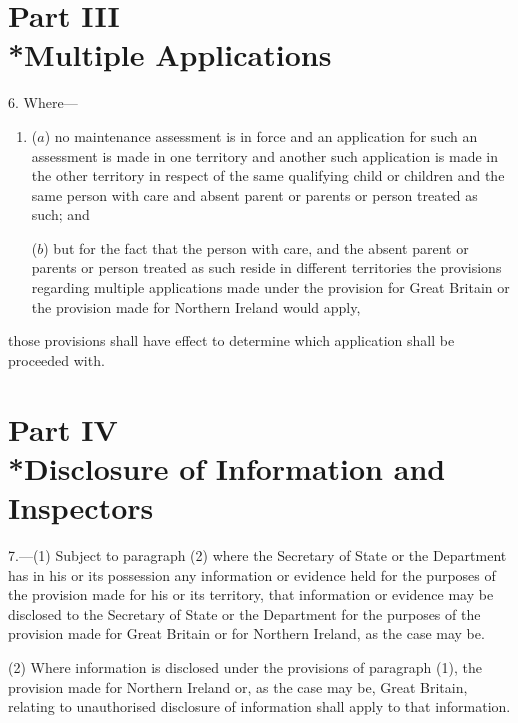 \documentclass[12pt,a4paper]{article}
\begin{document}
\section[Part III --- Multiple Applications]{Part III\\*Multiple Applications}

\renewcommand\parthead{--- Schedule 1 Part III}

6.  Where—
\begin{enumerate}\item[]
($a$) no maintenance assessment is in force and an application for such an assessment is made in one territory and another such application is made in the other territory in respect of the same qualifying child or children and the same person with care and absent parent or parents or person treated as such; and

($b$) but for the fact that the person with care, and the absent parent or parents or person treated as such reside in different territories the provisions regarding multiple applications made under the provision for Great Britain or the provision made for Northern Ireland would apply,
\end{enumerate}
those provisions shall have effect to determine which application shall be proceeded with.

\section[Part IV --- Disclosure of Information and Inspectors]{Part IV\\*Disclosure of Information and Inspectors}

\renewcommand\parthead{--- Schedule 1 Part IV}

7.—(1) Subject to paragraph (2) where the Secretary of State
or the Department  %
has in his or its possession any information or evidence held for the purposes of the provision made for his or its territory, that information or evidence may be disclosed to the Secretary of State
or the Department  %
for the purposes of the provision made for Great Britain or for Northern Ireland, as the case may be.

(2) Where information is disclosed under the provisions of paragraph (1), the provision made for Northern Ireland or, as the case may be, Great Britain, relating to unauthorised disclosure of information shall apply to that information.
\end{document}
